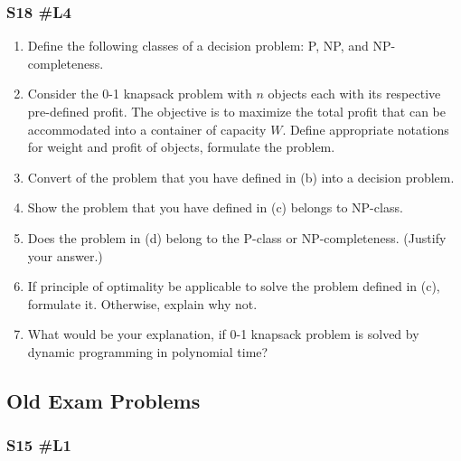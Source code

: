 \subsubsection{	S18 \#L4}
\begin{enumerate}[label=\alph*.]
		\item Define the following classes of a decision problem:  P, NP, and NP-completeness.
		\item Consider the 0-1 knapsack problem with $n$ objects each with its respective pre-defined profit.  The objective is to maximize the total profit that can be accommodated into a container of capacity $W$.  Define appropriate notations for weight and profit of objects, formulate the problem.
		\item Convert of the problem that you have defined in (b) into a decision problem.
		\item Show the problem that you have defined in (c) belongs to NP-class.
		\item Does the problem in (d) belong to the P-class or NP-completeness. (Justify your answer.)
		\item If principle of optimality be applicable to solve the problem defined in (c), formulate it.  Otherwise, explain why not.  
		\item What would be your explanation, if 0-1 knapsack problem is solved by dynamic programming in polynomial time?
\end{enumerate}

\subsection{Old Exam Problems}

\subsubsection{S15 \#L1}

